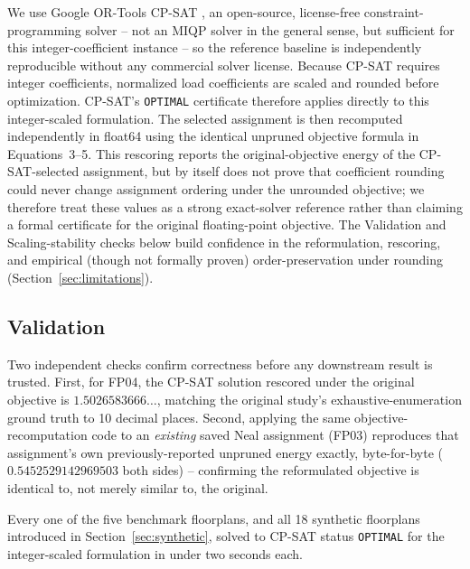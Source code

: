 \documentclass[11pt]{article}
\begin{document}
We use Google OR-Tools CP-SAT \cite{ortools}, an open-source, license-free constraint-programming solver -- not an MIQP solver in the general sense, but sufficient for this integer-coefficient instance -- so the reference baseline is independently reproducible without any commercial solver license. Because CP-SAT requires integer coefficients, normalized load coefficients are scaled and rounded before optimization. CP-SAT's \texttt{OPTIMAL} certificate therefore applies directly to this integer-scaled formulation. The selected assignment is then recomputed independently in float64 using the identical unpruned objective formula in Equations~3--5. This rescoring reports the original-objective energy of the CP-SAT-selected assignment, but by itself does not prove that coefficient rounding could never change assignment ordering under the unrounded objective; we therefore treat these values as a strong exact-solver reference rather than claiming a formal certificate for the original floating-point objective. The Validation and Scaling-stability checks below build confidence in the reformulation, rescoring, and empirical (though not formally proven) order-preservation under rounding (Section~\ref{sec:limitations}).

\subsection{Validation}
Two independent checks confirm correctness before any downstream result is trusted. First, for FP04, the CP-SAT solution rescored under the original objective is $1.5026583666\ldots$, matching the original study's exhaustive-enumeration ground truth to 10 decimal places. Second, applying the same objective-recomputation code to an \emph{existing} saved Neal assignment (FP03) reproduces that assignment's own previously-reported unpruned energy exactly, byte-for-byte ($0.5452529142969503$ both sides) -- confirming the reformulated objective is identical to, not merely similar to, the original.

Every one of the five benchmark floorplans, and all 18 synthetic floorplans introduced in Section~\ref{sec:synthetic}, solved to CP-SAT status \texttt{OPTIMAL} for the integer-scaled formulation in under two seconds each.
\end{document}
